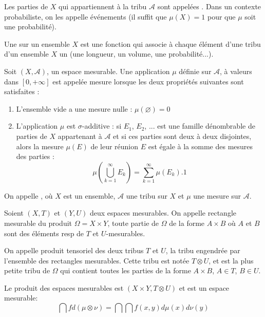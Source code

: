 Les parties de $X$ qui appartiennent à la tribu $\mathcal{A}$ sont appelées .
Dans un contexte probabiliste, on les appelle événements (il suffit que $\mu(X)=1$ pour que $\mu$ soit
une probabilité).

Une  sur un ensemble $X$ est une fonction qui
associe à chaque élément d'une tribu d'un ensemble $X$ un 
(une longueur, un volume, une probabilité...).

\begin{definition}[Mesure]
\medskip
Soit $(X,\mathcal{A})$, un espace mesurable.
Une application $\mu$ définie sur $\mathcal{A}$, à valeurs dans $[0,+\infty]$ est appelée
mesure lorsque les deux propriétés suivantes sont satisfaites :
\begin{enumerate}
   \item L'ensemble vide a une mesure nulle : $\mu\left(\varnothing\right)=0$
   \item L'application $\mu$ est $\sigma$-additive :
si $E_1$, $E_2$, ... est une famille dénombrable de parties de $X$ appartenant à
$\mathcal{A}$ et si ces parties sont deux à deux disjointes, alors la mesure $\mu(E)$ de leur réunion
$E$ est égale à la somme des mesures des parties :
\begin{equation}
\mu\left(\bigcup_{k=1}^{\infty}E_{k}\right)=\sum_{k=1}^{\infty}\mu(E_{k}).1
\end{equation}
\end{enumerate}
\end{definition}

On appelle ,
  où $X$ est un ensemble, $\mathcal{A}$ une tribu sur
$X$ et $\mu$ une mesure sur $\mathcal{A}$.

\medskip
{}
Soient $(X,T)$ et $(Y,U)$ deux espaces mesurables.
On appelle rectangle mesurable du produit $\Omega=X\times Y$, toute partie de $\Omega$
de la forme $A\times B$ où $A$ et $B$ sont des éléments resp de $T$ et $U$-mesurables.

On appelle produit tensoriel des deux tribus $T$ et $U$, la tribu
engendrée par l'ensemble des rectangles mesurables.
Cette tribu est notée $T \otimes U$, et est la plus petite tribu de $\Omega$ qui contient
toutes les parties de la forme $A\times B$, $A\in T$, $B\in U$.

Le produit des espaces mesurables est $(X\times Y, T \otimes U)$ et est un espace mesurable:
\begin{equation}
\dint fd(\mu \otimes \nu) = \dint\dint f(x,y) d\mu(x)d\nu(y)
\end{equation}

